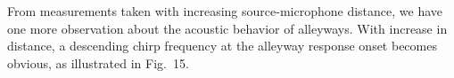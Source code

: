 \documentclass{aes137}
\begin{document}

%


From measurements taken with increasing source-microphone distance, we have one more observation about the acoustic behavior of alleyways. With increase in distance, a descending chirp frequency at the alleyway response onset becomes obvious, as illustrated in Fig.~15.
\end{document}
